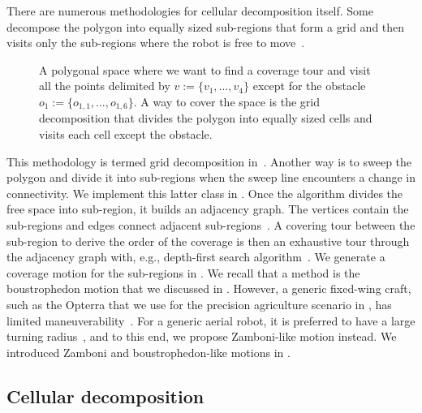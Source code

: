 There are numerous methodologies for cellular decomposition itself. Some decompose the polygon into equally sized sub-regions that form a grid and then visits only the sub-regions where the robot is free to move~\citep{galceran2013survey}. 
\begin{figure}[h!]
  \centering
  \selectfont
  
  \caption[Grid decomposition]{A polygonal space where we want to find a coverage tour and visit all the points delimited by $v:=\{v_1,\dots,v_4\}$ except for the obstacle $o_1:=\{o_{1,1},\dots,o_{1,6}\}$. A way to cover the space is the grid decomposition that divides the polygon into equally sized cells and visits each cell except the obstacle.}
  \label{fig:gride}
\end{figure}
This methodology is termed grid decomposition in~. Another way is to sweep the polygon and divide it into sub-regions when the sweep line encounters a change in connectivity. We implement this latter class in .
Once the algorithm divides the free space into sub-region, it builds an adjacency graph. The vertices contain the sub-regions and edges connect adjacent sub-regions~\citep{choset2005principles}. A covering tour between the sub-region to derive the order of the coverage is then an exhaustive tour through the adjacency graph with, e.g., depth-first search algorithm~\citep{choset2005principles}. We generate a coverage motion for the sub-regions in . We recall that a method is the boustrophedon motion that we discussed in . However, a generic fixed-wing craft, such as the Opterra that we use for the precision agriculture scenario in , has limited maneuverability~\citep{mannadiar2010optimal,xu2011optimal,xu2014efficient}. For a generic aerial robot, it is preferred to have a large turning radius~\citep{wang2017curvature}, and to this end, we propose Zamboni-like motion instead. We introduced Zamboni and boustrophedon-like motions in .

\subsection{Cellular decomposition}
\label{sec:cell-deco}

